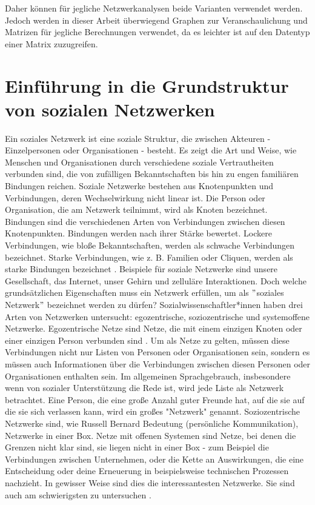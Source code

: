 Daher können für jegliche Netzwerkanalysen beide Varianten verwendet werden. Jedoch werden in dieser Arbeit überwiegend Graphen zur Veranschaulichung und Matrizen für jegliche Berechnungen verwendet, da es leichter ist auf den Datentyp einer Matrix zuzugreifen.\\

\section{Einführung in die Grundstruktur von sozialen Netzwerken}
Ein soziales Netzwerk ist eine soziale Struktur, die zwischen Akteuren - Einzelpersonen oder Organisationen - besteht. Es zeigt die Art und Weise, wie Menschen und Organisationen durch verschiedene soziale Vertrautheiten verbunden sind, die von zufälligen Bekanntschaften bis hin zu engen familiären Bindungen reichen. Soziale Netzwerke bestehen aus Knotenpunkten und Verbindungen, deren Wechselwirkung nicht linear ist. Die Person oder Organisation, die am Netzwerk teilnimmt, wird als Knoten bezeichnet. Bindungen sind die verschiedenen Arten von Verbindungen zwischen diesen Knotenpunkten. Bindungen werden nach ihrer Stärke bewertet. Lockere Verbindungen, wie bloße Bekanntschaften, werden als schwache Verbindungen bezeichnet. Starke Verbindungen, wie z. B. Familien oder Cliquen, werden als starke Bindungen bezeichnet \cite{SNADefinition}. Beispiele für soziale Netzwerke sind unsere Gesellschaft, das Internet, unser Gehirn und zelluläre Interaktionen.
Doch welche grundsätzlichen Eigenschaften muss ein Netzwerk erfüllen, um als $"$soziales Netzwerk$"$ bezeichnet werden zu dürfen? 
Sozialwissenschaftler*innen haben drei Arten von Netzwerken untersucht: egozentrische, soziozentrische und systemoffene
Netzwerke. Egozentrische Netze sind Netze, die mit einem einzigen Knoten oder einer einzigen Person verbunden sind \cite{egocentric}. Um als Netze zu gelten, müssen diese Verbindungen nicht nur Listen von Personen oder Organisationen sein, sondern es müssen auch Informationen über die Verbindungen zwischen diesen Personen oder Organisationen enthalten sein. Im allgemeinen Sprachgebrauch, insbesondere wenn von sozialer Unterstützung die Rede ist, wird jede Liste als Netzwerk betrachtet. Eine Person, die eine große Anzahl guter Freunde hat, auf die sie auf die sie sich verlassen kann, wird ein großes "Netzwerk" genannt. Soziozentrische Netzwerke sind, wie Russell Bernard Bedeutung (persönliche Kommunikation), Netzwerke in einer Box. Netze mit offenen Systemen sind Netze, bei denen die Grenzen nicht klar sind, sie liegen nicht in einer Box - zum Beispiel die Verbindungen zwischen Unternehmen, oder die Kette an Auswirkungen, die eine Entscheidung oder deine Erneuerung in beispielsweise technischen Prozessen nachzieht. In gewisser Weise sind dies die interessantesten Netzwerke. Sie sind auch am schwierigsten zu untersuchen \cite{charlesKadushin}. 




